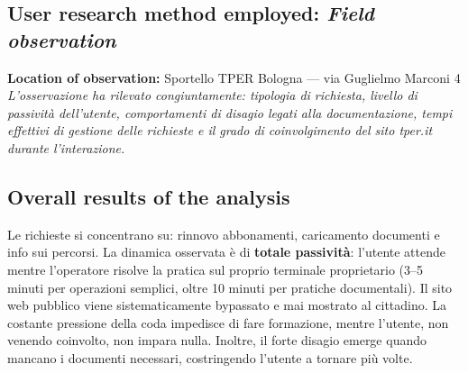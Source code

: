 \documentclass[11pt,a4paper]{article}
\begin{document}
\subsection*{User research method employed: \textit{Field observation}}
\begin{tcolorbox}[colback=backgroundColor,colframe=borderColor,arc=2mm]
\textbf{Location of observation:} Sportello TPER Bologna --- via Guglielmo Marconi 4 \\[0.4cm]
\textit{L'osservazione ha rilevato congiuntamente: tipologia di richiesta, livello di passività dell'utente, comportamenti di disagio legati alla documentazione, tempi effettivi di gestione delle richieste e il grado di coinvolgimento del sito tper.it durante l'interazione.}
\end{tcolorbox}

\subsection*{Overall results of the analysis}
\begin{tcolorbox}[colback=backgroundColor,colframe=borderColor,arc=2mm]
Le richieste si concentrano su: rinnovo abbonamenti, caricamento documenti e info sui percorsi. La dinamica osservata è di \textbf{totale passività}: l'utente attende mentre l'operatore risolve la pratica sul proprio terminale proprietario (3--5 minuti per operazioni semplici, oltre 10 minuti per pratiche documentali). Il sito web pubblico viene sistematicamente bypassato e mai mostrato al cittadino. La costante pressione della coda impedisce di fare formazione, mentre l'utente, non venendo coinvolto, non impara nulla. Inoltre, il forte disagio emerge quando mancano i documenti necessari, costringendo l'utente a tornare più volte.
\end{tcolorbox}
\end{document}
